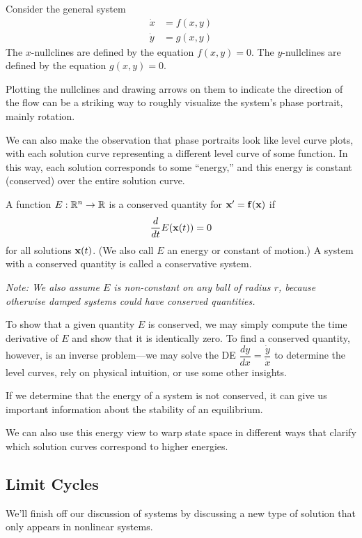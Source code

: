 \documentclass[../m082main.tex]{subfiles}
\begin{document}
\begin{definition}[Nullclines]
    Consider the general system
    \begin{align*}
        \dot x &= f(x,y) \\
        \dot y &= g(x,y)
    \end{align*}
    The $x$-nullclines are defined by the equation $f(x,y) = 0$.
    The $y$-nullclines are defined by the equation $g(x,y) = 0$.
\end{definition}

Plotting the nullclines and drawing arrows on them to indicate the direction of the flow can be a striking way to roughly visualize the system's phase portrait, mainly rotation.

We can also make the observation that phase portraits look like level curve plots, with each solution curve representing a different level curve of some function.
In this way, each solution corresponds to some ``energy,'' and this energy is constant (conserved) over the entire solution curve.

\begin{definition}
    A function $E : \mathbb{R}^n \to \mathbb{R}$ is a conserved quantity for $\mathbf{x}' = \mathbf{f} (\mathbf{x})$ if
    \[ \frac{d}{dt} E (\mathbf{x} (t)) = 0 \]
    for all solutions $\mathbf{x} (t)$.
    (We also call $E$ an energy or constant of motion.)
    A system with a conserved quantity is called a conservative system.

    \textit{Note: We also assume $E$ is non-constant on any ball of radius $r$, because otherwise damped systems could have conserved quantities.}
\end{definition}

To show that a given quantity $E$ is conserved, we may simply compute the time derivative of $E$ and show that it is identically zero.
To find a conserved quantity, however, is an inverse problem---we may solve the DE $\dfrac{dy}{dx} = \dfrac{\dot y}{\dot x}$ to determine the level curves, rely on physical intuition, or use some other insights.

If we determine that the energy of a system is not conserved, it can give us important information about the stability of an equilibrium.

We can also use this energy view to warp state space in different ways that clarify which solution curves correspond to higher energies.

\subsection{Limit Cycles}
We'll finish off our discussion of systems by discussing a new type of solution that only appears in nonlinear systems.
\end{document}

